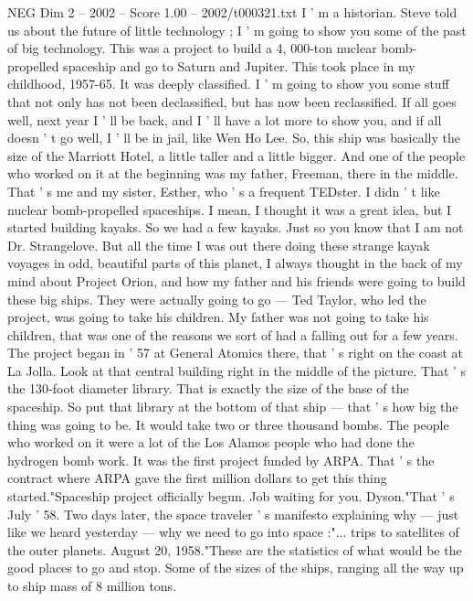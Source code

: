 \begin{textsample}{NEG Dim 2 – 2002 – Score 1.00 – 2002/t000321.txt}  \label{ex:f2_neg_042}
I ' m a historian.
Steve told us about the future of little technology ; I ' m going to show you some of the past of big technology.
This was a project to build a 4, 000-ton nuclear bomb-propelled spaceship and go to Saturn and Jupiter.
This took place in my childhood, 1957-65.
It was deeply classified.
I ' m going to show you some stuff that not only has not been declassified, but has now been reclassified.
If all goes well, next year I ' ll be back, and I ' ll have a lot more to show you, and if all doesn ' t go well, I ' ll be in jail, like Wen Ho Lee.
So, this ship was basically the size of the Marriott Hotel, a little taller and a little bigger.
And one of the people who worked on it at the beginning was my father, Freeman, there in the middle.
That ' s me and my sister, Esther, who ' s a frequent TEDster.
I didn ' t like nuclear bomb-propelled spaceships.
I mean, I thought it was a great idea, but I started building kayaks.
So we had a few kayaks.
Just so you know that I am not Dr.
Strangelove.
But all the time I was out there doing these strange kayak voyages in odd, beautiful parts of this planet, I always thought in the back of my mind about Project Orion, and how my father and his friends were going to build these big ships.
They were actually going to go — Ted Taylor, who led the project, was going to take his children.
My father was not going to take his children, that was one of the reasons we sort of had a falling out for a few years.
The project began in ' 57 at General Atomics there, that ' s right on the coast at La Jolla.
Look at that central building right in the middle of the picture.
That ' s the 130-foot diameter library.
That is exactly the size of the base of the spaceship.
So put that library at the bottom of that ship — that ' s how big the thing was going to be.
It would take two or three thousand bombs.
The people who worked on it were a lot of the Los Alamos people who had done the hydrogen bomb work.
It was the first project funded by ARPA.
That ' s the contract where ARPA gave the first million dollars to get this thing started."Spaceship project officially begun.
Job waiting for you.
Dyson."That ' s July ' 58.
Two days later, the space traveler ' s manifesto explaining why — just like we heard yesterday — why we need to go into space :"... trips to satellites of the outer planets.
August 20, 1958."These are the statistics of what would be the good places to go and stop.
Some of the sizes of the ships, ranging all the way up to ship mass of 8 million tons.

\end{textsample}
